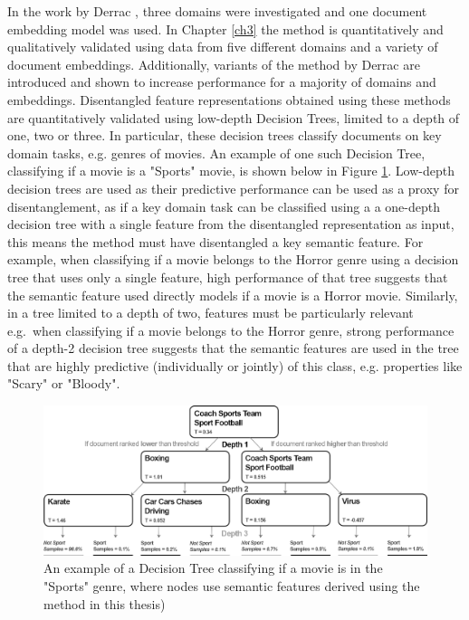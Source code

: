 In the work by Derrac  \cite{Derrac2015}, three domains were investigated and one document embedding model was used. In Chapter \ref{ch3} the method is quantitatively and qualitatively validated using data from five different domains and a variety of document embeddings. Additionally, variants of the method by Derrac \cite{Derrac2015} are introduced and shown to increase performance for a majority of domains and embeddings.  Disentangled feature representations obtained using these methods are quantitatively validated using  low-depth Decision Trees, limited to a depth of one, two or three. In particular, these decision trees classify documents on key domain tasks, e.g. genres of movies. An example of one such Decision Tree, classifying if a movie is a "Sports" movie, is shown below in Figure \ref{ch1:DecisionTree}. Low-depth decision trees are used as their predictive performance can be used as a proxy for disentanglement, as if a key domain task can be classified using a a one-depth decision tree with a single feature from the disentangled representation as input, this means the method must have disentangled a key semantic feature. For example, when classifying if a movie belongs to the Horror genre using  a decision tree that uses only a single feature,  high performance of that tree suggests that the semantic feature used directly models if a movie is a Horror movie. Similarly, in a tree limited to a depth of two,  features must be particularly relevant e.g.\ when classifying if a movie belongs to the Horror genre, strong performance of a depth-2 decision tree suggests that the semantic features are used in the tree that are highly predictive (individually or jointly) of this class, e.g. properties like "Scary" or "Bloody". 

\begin{figure}[t]
	\includegraphics[width=450px]{images/decision_tree_ex.png}
	\centering
	\caption{An example of a Decision Tree classifying if a movie is in the "Sports" genre, where nodes use semantic features derived using the method in this thesis)}\label{ch1:DecisionTree}
\end{figure}

